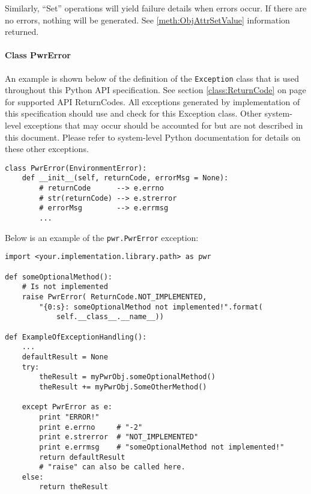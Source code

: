Similarly, ``Set'' operations will yield failure details when errors occur.  If
there are no errors, nothing will be generated.  See \ref{meth:ObjAttrSetValue}
information returned.

\paragraph{Class PwrError} \label{class:PwrError}

An example is shown below of the definition of the
\texttt{Exception} class that is used throughout this
Python API specification. See section \ref{class:ReturnCode} on page
\pageref{class:ReturnCode} for supported API ReturnCodes. All exceptions
generated by implementation of this specification should use and check for this
Exception class. Other system-level exceptions that may occur should be
accounted for but are not described in this document. Please refer to
system-level Python documentation for details on these other exceptions.

\begin{center}\begin{minipage}{.95\linewidth}\begin{lstlisting}
class PwrError(EnvironmentError):
    def __init__(self, returnCode, errorMsg = None):
        # returnCode      --> e.errno
        # str(returnCode) --> e.strerror
        # errorMsg        --> e.errmsg
        ...
\end{lstlisting}\end{minipage}\end{center}

Below is an example of the \texttt{pwr.PwrError} exception:

\begin{center}\begin{minipage}{.95\linewidth}\begin{lstlisting}
import <your.implementation.library.path> as pwr

def someOptionalMethod():
    # Is not implemented
    raise PwrError( ReturnCode.NOT_IMPLEMENTED,
        "{0:s}: someOptionalMethod not implemented!".format(
            self.__class__.__name__))

def ExampleOfExceptionHandling():
    ...
    defaultResult = None
    try:
        theResult = myPwrObj.someOptionalMethod()
        theResult += myPwrObj.SomeOtherMethod()

    except PwrError as e:
        print "ERROR!"
        print e.errno     # "-2"
        print e.strerror  # "NOT_IMPLEMENTED"
        print e.errmsg    # "someOptionalMethod not implemented!"
        return defaultResult
        # "raise" can also be called here.
    else:
        return theResult
\end{lstlisting}\end{minipage}\end{center}

